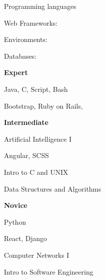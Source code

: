 \vspace*{-5mm}
\begin{cventries}
    \cventry{}{}{}{}
        {
        \begin{multicols}{4}%
            \vspace*{-0mm}
                \begin{cvitems}
                    \item {Programming languages}
                    \item {Web Frameworks:}
                    \item {Environments:}
                    \item {Databases:}
                \end{cvitems}
            \columnbreak
            \vspace*{-12mm}
             \textbf{Expert}
             \vspace*{6mm}
                \begin{cvitems}
                    \item [] {Java, C, Script, Bash}
                    \item [] {Bootstrap, Ruby on Rails, }
                    \item [] {}
                   \item [] {}
                \end{cvitems}
            \columnbreak
            \vspace*{-12mm}
            \textbf{Intermediate}
            \vspace*{6mm}
            \begin{cvitems}
                \item [] {Artificial Intelligence I}
                \item [] {Angular, SCSS}
                \item []{Intro to C and UNIX}
               \item [] {Data Structures and Algorithms}
         \end{cvitems}
        \columnbreak
        \vspace*{-12mm}
        \textbf{Novice}
        \vspace*{6mm}
            \begin{cvitems}
                \item []{Python}
                \item []{React, Django}
                \item []{Computer Networks I}
                \item []{Intro to Software Engineering}
            \end{cvitems}
        \end{multicols}
        }
    \end{cventries}
\vspace*{-14mm}

